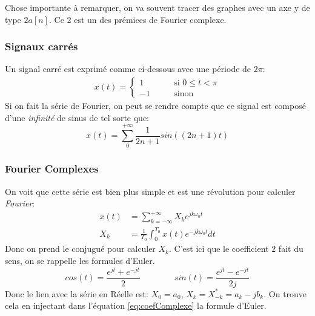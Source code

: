 \documentclass{report}
\begin{document}
Chose importante à remarquer, on va souvent tracer des graphes avec un axe y de type $2a[n]$. Ce 2 est un des prémices de Fourier complexe.

\subsubsection{Signaux carrés}
Un signal carré est exprimé comme ci-dessous avec une période de $2\pi$:
\begin{align}
x(t) = \begin{cases}
1 \qquad &\text{si } 0 \leq t < \pi\\
-1 \qquad &\text{sinon}
\end{cases}
\end{align}
Si on fait la série de Fourier, on peut se rendre compte que ce signal est composé d'une \textit{infinité} de sinus de tel sorte que:
\begin{equation}
x(t) = \sum_0^{+\infty} \frac{1}{2n+1} sin((2n+1)t)
\end{equation}

\subsubsection{Fourier Complexes}
On voit que cette série est bien plus simple et est une révolution pour calculer \textit{Fourier}:
\begin{align}
x(t) &= \sum_{k = - \infty}^{+ \infty} X_k e^{jk\omega_0 t}\\
X_k &= \frac{1}{T_0} \int_0^{T_0} x(t) e^{-jk\omega_0t}dt \label{eq:coefComplexe}
\end{align}
Donc on prend le conjugué pour calculer $X_k$. C'est ici que le coefficient $2$ fait du sens, on se rappelle les formules d'Euler.
\begin{equation}
cos(t) = \frac{e^{jt} + e^{-jt}}{2} \qquad \qquad sin(t) = \frac{e^{jt} - e^{-jt}}{2j}
\end{equation}
Donc le lien avec la série en Réelle est: $X_0 = a_0$, $X_k = X_{-k}^{*} = a_k -jb_k$. On trouve cela en injectant dans l'équation \ref{eq:coefComplexe} la formule d'Euler.
\end{document}
